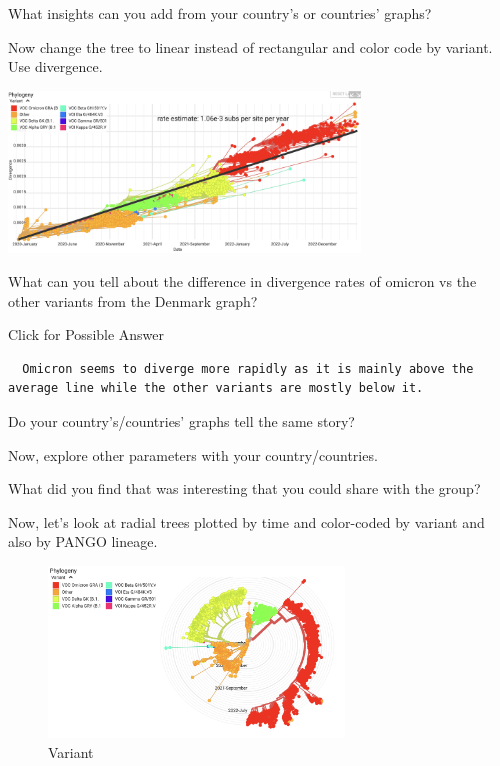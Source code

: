 \documentclass[
]{book}
\begin{document}
\hfill\break
What insights can you add from your country's or countries' graphs?

\hfill\break

Now change the tree to linear instead of rectangular and color code by variant. Use divergence.

\includegraphics[width=0.7\textwidth,height=\textheight]{./Figures/DenmarkLinear.png}

What can you tell about the difference in divergence rates of omicron vs the other variants from the Denmark graph?

Click for Possible Answer

\begin{verbatim}
  Omicron seems to diverge more rapidly as it is mainly above the average line while the other variants are mostly below it.
\end{verbatim}

Do your country's/countries' graphs tell the same story?

Now, explore other parameters with your country/countries.

What did you find that was interesting that you could share with the group?

Now, let's look at radial trees plotted by time and color-coded by variant and also by PANGO lineage.

\begin{figure}
\centering
\includegraphics[width=0.7\textwidth,height=\textheight]{./Figures/DenmarkRadialTime.png}
\caption{Variant}
\end{figure}
\end{document}
